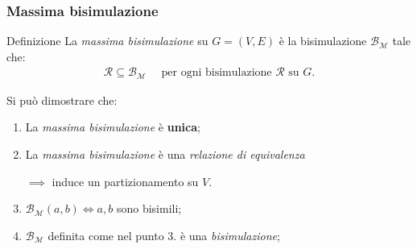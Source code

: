 \documentclass{beamer}
\begin{document}
\begin{frame}\frametitle{Massima bisimulazione}
    \begin{block}{Definizione}
        La \emph{massima bisimulazione} su $G = (V,E)$ è la bisimulazione $\mathcal{B}_\mathcal{M}$ tale che:
        \begin{gather*}
            \mathcal{R} \subseteq \mathcal{B}_\mathcal{M} \quad \text{ per ogni bisimulazione } \mathcal{R} \text{ su } G.
        \end{gather*}
    \end{block}

    \bigskip\bigskip

    Si può dimostrare che:
    \begin{enumerate}
        \item La \emph{massima bisimulazione} è \textbf{unica};
        \item La \emph{massima bisimulazione} è una \emph{relazione di equivalenza}

        $\implies$ induce un partizionamento su $V$.
        \item $\mathcal{B}_\mathcal{M}(a,b) \iff a,b$ sono bisimili;
        \item $\mathcal{B}_\mathcal{M}$ definita come nel punto 3. è una \emph{bisimulazione};
    \end{enumerate}
\end{frame}
\end{document}
